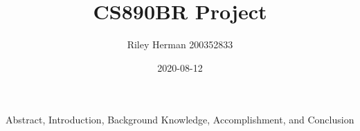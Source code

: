 \documentclass{article}
\title{CS890BR Project}
\date{2020-08-12}
\author{Riley Herman 200352833}
\begin{document}
    \maketitle
    \newpage
    Abstract, Introduction, Background Knowledge, Accomplishment, and Conclusion
\end{document}
